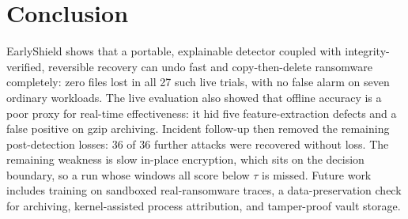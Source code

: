 \documentclass[conference]{IEEEtran}
\begin{document}
\section{Conclusion}
EarlyShield shows that a portable, explainable detector coupled with integrity-verified, reversible recovery can undo fast and copy-then-delete ransomware completely: zero files lost in all 27 such live trials, with no false alarm on seven ordinary workloads. The live evaluation also showed that offline accuracy is a poor proxy for real-time effectiveness: it hid five feature-extraction defects and a false positive on gzip archiving. Incident follow-up then removed the remaining post-detection losses: 36 of 36 further attacks were recovered without loss. The remaining weakness is slow in-place encryption, which sits on the decision boundary, so a run whose windows all score below $\tau$ is missed. Future work includes training on sandboxed real-ransomware traces, a data-preservation check for archiving, kernel-assisted process attribution, and tamper-proof vault storage.



\end{document}
